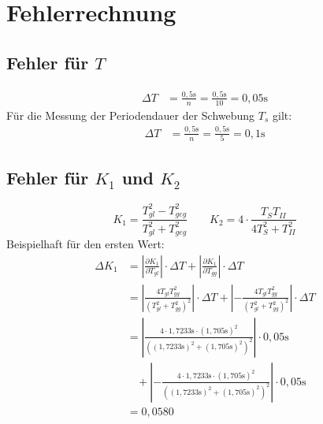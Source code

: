 \chapter{Fehlerrechnung}
	\section{Fehler für $T$}
    \begin{align*}
    	\Delta T &= \frac{0,5\si{\second}}{n} =\frac{0,5\si{\second}}{10}
        = 0,05\si{\second}
    \end{align*}
    Für die Messung der Periodendauer der Schwebung $T_s$ gilt:
    \begin{align*}
    	\Delta T &= \frac{0,5\si{\second}}{n} =\frac{0,5\si{\second}}{5}
        = 0,1\si{\second}
    \end{align*}
    
    \section{Fehler für $K_1$ und $K_2$}
    \begin{equation*}
    K_1 = \frac{T^2_{gl}-T^2_{geg}}{T^2_{gl}+T^2_{geg}} ~~~~~~~~~ K_2 = 4 \cdot \frac{T_S T_{II}}{4T^2_{S}+T^2_{II}}
    \end{equation*}
    Beispielhaft für den ersten Wert:
    \begin{align*}
    	\Delta K_1 &= \left|\frac{\partial K_1}{\partial T_{gl}}\right| \cdot \Delta T + \left| \frac{\partial K_1}{\partial T_{gg}}\right| \cdot \Delta T \\
        &= \left|\frac{4T_{gl}T_{gg}^2}{(T_{gl}^2 + T_{gg}^2)^2}\right| \cdot \Delta T + \left| - \frac{4T_{gl}T_{gg}^2}{(T_{gl}^2 + T_{gg}^2)^2}\right| \cdot \Delta T \\
        &= \left|\frac{4 \cdot 1,7233\si{\second} \cdot (1,705\si{\second})^2}{((1,7233\si{\second})^2 + (1,705\si{\second})^2)^2}\right| \cdot 0,05\si{\second}  \\ & ~~~~+ \left| - \frac{4 \cdot 1,7233\si{\second} \cdot (1,705\si{\second})^2}{((1,7233\si{\second})^2 + (1,705\si{\second})^2)^2}\right| \cdot 0,05\si{\second} \\
        &= 0,0580
    \end{align*}
    
